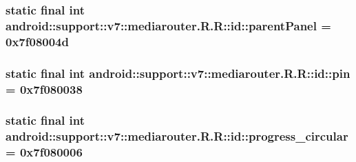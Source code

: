 \hypertarget{classandroid_1_1support_1_1v7_1_1mediarouter_1_1_r_1_1id_ecc022f9d265a3038d1cdade4b6049c9}{
\subsubsection[{parentPanel}]{\setlength{\rightskip}{0pt plus 5cm}static final int android::support::v7::mediarouter.R.R::id::parentPanel = 0x7f08004d}}
\label{classandroid_1_1support_1_1v7_1_1mediarouter_1_1_r_1_1id_ecc022f9d265a3038d1cdade4b6049c9}


\hypertarget{classandroid_1_1support_1_1v7_1_1mediarouter_1_1_r_1_1id_7bf64bddb8e7a7bde3e60bb11de94169}{
\subsubsection[{pin}]{\setlength{\rightskip}{0pt plus 5cm}static final int android::support::v7::mediarouter.R.R::id::pin = 0x7f080038}}
\label{classandroid_1_1support_1_1v7_1_1mediarouter_1_1_r_1_1id_7bf64bddb8e7a7bde3e60bb11de94169}


\hypertarget{classandroid_1_1support_1_1v7_1_1mediarouter_1_1_r_1_1id_f7b47b11a8b2c397142712b508375b5e}{
\subsubsection[{progress\_\-circular}]{\setlength{\rightskip}{0pt plus 5cm}static final int android::support::v7::mediarouter.R.R::id::progress\_\-circular = 0x7f080006}}
\label{classandroid_1_1support_1_1v7_1_1mediarouter_1_1_r_1_1id_f7b47b11a8b2c397142712b508375b5e}


